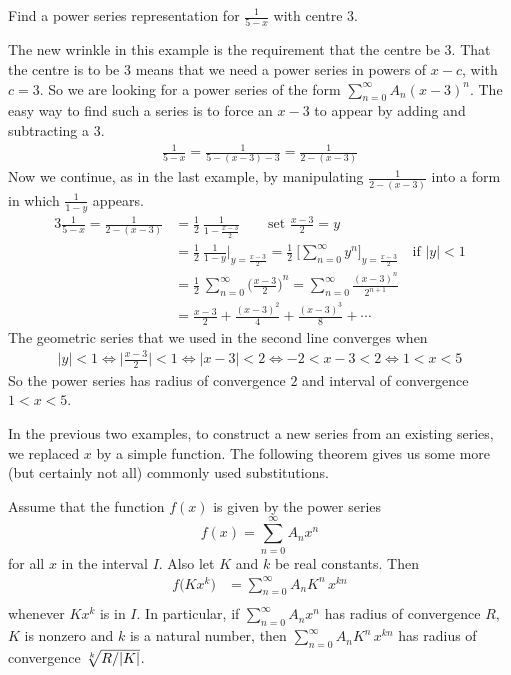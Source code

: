 \goodbreak
\begin{eg}\label{eg:SRpsrepAAA}
Find a power series representation for $\frac{1}{5-x}$ with centre
$3$.

\soln
The new wrinkle in this example is the requirement that the centre
be $3$. That the centre is to be $3$ means that we need a power series
in powers of $x-c$, with $c=3$.  So we are looking for a power
series of the form $\sum_{n=0}^\infty A_n(x-3)^n$. The easy way
to find such a series is to force an $x-3$ to appear by adding
and subtracting a $3$.
\begin{align*}
\frac{1}{5-x}
=\frac{1}{5-(x-3)-3}
=\frac{1}{2-(x-3)}
\end{align*}
Now we continue, as in the last example, by manipulating $\frac{1}{2-(x-3)}$
into a form in which $\frac{1}{1-y}$ appears.
\begin{alignat*}{3}
\frac{1}{5-x}
=\frac{1}{2-(x-3)} &= \frac{1}{2}\ \frac{1}{1-\frac{x-3}{2}}
             \qquad \text{set $\frac{x-3}{2}=y$} \\
             &= \frac{1}{2}\ \frac{1}{1-y}\bigg|_{y=\frac{x-3}{2}}
             = \frac{1}{2}\ \bigg[\sum_{n=0}^\infty y^n
                                     \bigg]_{y=\frac{x-3}{2}}
                   \quad\text{if $|y|<1$} \\
             &= \frac{1}{2}\ \sum_{n=0}^\infty {\Big(\frac{x-3}{2}\Big)}^n
             = \sum_{n=0}^\infty \frac{(x-3)^n}{2^{n+1}} \\
             &= \frac{x-3}{2} + \frac{(x-3)^2}{4} + \frac{(x-3)^3}{8}
                 +\cdots
\end{alignat*}
The geometric series that we used in the second line converges when
\begin{align*}
|y|<1
\iff  \Big|\frac{x-3}{2}\Big|<1
\iff  |x-3|<2
\iff -2<x-3<2
\iff 1<x<5
\end{align*}
So the power series has radius of convergence $2$ and interval of
convergence $1<x<5$.
\end{eg}


In the previous two examples, to construct a new series from an
existing series, we replaced $x$ by a simple function. The following
theorem gives us some more (but certainly not all) commonly
used substitutions.


\begin{theorem}\label{thm:SRpsSub}
Assume that the function $f(x)$ is given by the power
series
\begin{equation*}
f(x) = \sum_{n=0}^\infty A_n x^n
\end{equation*}
for all $x$ in the interval $I$. Also let $K$ and $k$ be real constants. Then
\begin{align*}
f\big(Kx^k\big)   &= \sum_{n=0}^\infty A_nK^n\, x^{kn} \\
\end{align*}
whenever $Kx^k$ is in $I$. In particular, if $\sum_{n=0}^\infty A_n x^n$
has radius of convergence $R$, $K$ is nonzero and $k$ is a natural number,
then $\sum_{n=0}^\infty A_nK^n\, x^{kn}$ has radius of convergence
$\root{k}\of{R/|K|}$.
\end{theorem}


